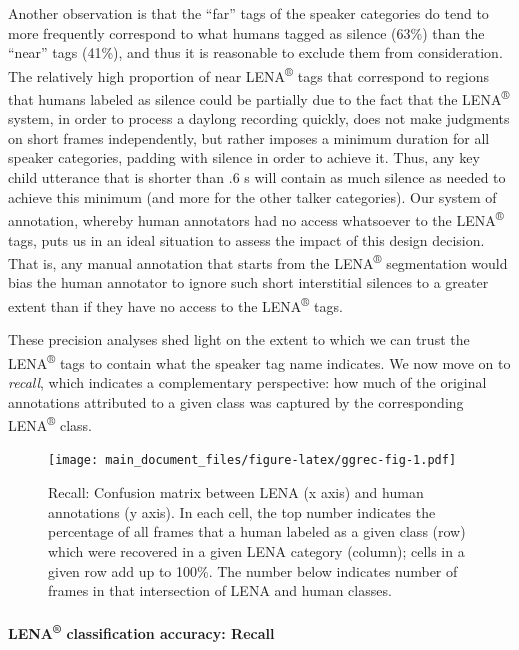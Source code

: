 \documentclass[english,floatsintext,man]{apa6}
\begin{document}
Another observation is that the \enquote{far} tags of the speaker
categories do tend to more frequently correspond to what humans tagged
as silence (63\%) than the \enquote{near} tags (41\%), and thus it is
reasonable to exclude them from consideration. The relatively high
proportion of near LENA\textsuperscript{®} tags that correspond to
regions that humans labeled as silence could be partially due to the
fact that the LENA\textsuperscript{®} system, in order to process a
daylong recording quickly, does not make judgments on short frames
independently, but rather imposes a minimum duration for all speaker
categories, padding with silence in order to achieve it. Thus, any key
child utterance that is shorter than .6 s will contain as much silence
as needed to achieve this minimum (and more for the other talker
categories). Our system of annotation, whereby human annotators had no
access whatsoever to the LENA\textsuperscript{®} tags, puts us in an
ideal situation to assess the impact of this design decision. That is,
any manual annotation that starts from the LENA\textsuperscript{®}
segmentation would bias the human annotator to ignore such short
interstitial silences to a greater extent than if they have no access to
the LENA\textsuperscript{®} tags.

These precision analyses shed light on the extent to which we can trust
the LENA\textsuperscript{®} tags to contain what the speaker tag name
indicates. We now move on to \emph{recall}, which indicates a
complementary perspective: how much of the original annotations
attributed to a given class was captured by the corresponding
LENA\textsuperscript{®} class.

\begin{figure}
\centering
\texttt{[image: main\_document\_files/figure-latex/ggrec-fig-1.pdf]}
\caption{\label{fig:ggrec-fig}Recall: Confusion matrix between LENA (x axis)
and human annotations (y axis). In each cell, the top number indicates
the percentage of all frames that a human labeled as a given class (row)
which were recovered in a given LENA category (column); cells in a given
row add up to 100\%. The number below indicates number of frames in that
intersection of LENA and human classes.}
\end{figure}

\paragraph{\texorpdfstring{LENA\textsuperscript{®} classification
accuracy:
Recall}{LENA® classification accuracy: Recall}}\label{lena-classification-accuracy-recall}
\end{document}
